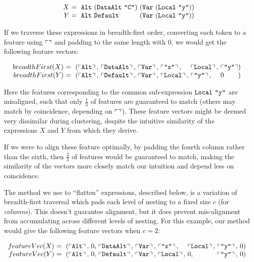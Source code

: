 \begin{equation*}
  \begin{array}{r@{}l@{}l@{}}
    X\ &=\ \CAlt\ (\CDataAlt\ \id{C})\ & (\vlocal{y}) \\
    Y\ &=\ \CAlt\ \CDefault\           & (\vlocal{y})
  \end{array}
\end{equation*}

If we traverse these expressions in breadth-first order, converting each token to a feature using $\left\ulcorner  \right\urcorner$ and padding to the same length with $0$, we would get the following feature vectors:

\begin{small}
  \begin{equation*}
    \begin{array}{r@{}l@{}l@{}l@{}l@{}l@{}l@{}l}
      breadthFirst(X)\ &=\ (\feature{\CAlt},\ &\feature{\CDataAlt},\ &\feature{\CVar},\ &\feature{\id{x}},\ &\feature{\CLocal},\ &\feature{\id{y}} &) \\
      breadthFirst(Y)\ &=\ (\feature{\CAlt},\ &\feature{\CDefault},\ &\feature{\CVar},\ &\feature{\CLocal},\ &\feature{\id{y}},\ &0 &)
    \end{array}
  \end{equation*}
\end{small}

Here the features corresponding to the common sub-expression $\texttt{Local}\ \texttt{"y"}$ are misaligned, such that only $\frac{1}{3}$ of features are guaranteed to match (others may match by coincidence, depending on $\left\ulcorner  \right\urcorner$). These feature vectors might be deemed very dissimilar during clustering, despite the intuitive similarity of the expressions $X$ and $Y$ from which they derive.

If we were to align these feature optimally, by padding the fourth column rather than the sixth, then $\frac{2}{3}$ of features would be guaranteed to match, making the similarity of the vectors more closely match our intuition and depend less on coincidence.

The method we use to ``flatten'' expressions, described below, is a variation of breadth-first traversal which pads each level of nesting to a fixed size $c$ (for \emph{columns}). This doesn't guarantee alignment, but it does prevent mis-alignment from accumulating across different levels of nesting. For this example, our method would give the following feature vectors when $c = 2$:

\begin{small}
  \begin{equation}\label{eq:flattened}
    \begin{array}{r@{}l@{}l@{}l@{}l@{}l@{}l@{}l@{}l@{}l}
      featureVec(X)\ &=\ (\feature{\CAlt},\ &0,\ &\feature{\CDataAlt},\ &\feature{\CVar},\ &\feature{\id{x}},\  &\feature{\CLocal},\ &\feature{\id{y}},\ &0 &) \\
      featureVec(Y)\ &=\ (\feature{\CAlt},\ &0,\ &\feature{\CDefault},\ &\feature{\CVar},\ &\feature{\CLocal},\ &0,\                 &\feature{\id{y}},\ &0 &)
    \end{array}
  \end{equation}
\end{small}

